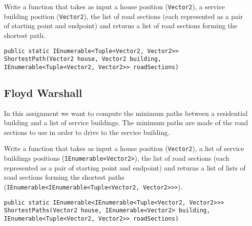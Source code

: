 \documentclass[10pt,a4paper]{article}
\begin{document}
Write a function that takes as input a house position (\texttt{Vector2}), a service building position (\texttt{Vector2}), the list of road sections (each represented as a pair of starting point and endpoint) and returns a list of road sections forming the shortest path.

\begin{lstlisting}
public static IEnumerable<Tuple<Vector2, Vector2>> ShortestPath(Vector2 house, Vector2 building, IEnumerable<Tuple<Vector2, Vector2>> roadSections)
\end{lstlisting}

\subsection*{Floyd Warshall}
In this assignment we want to compute the minimum paths between a residential building and a list of service buildings. The minimum paths are made of the road sections to use in order to drive to the service building.

Write a function that takes as input a house position (\texttt{Vector2}), a list of service buildings positions (\texttt{IEnumerable<Vector2>}), the list of road sections (each represented as a pair of starting point and endpoint) and returns a list of lists of road sections forming the shortest paths (\texttt{IEnumerable<IEnumerable<Tuple<Vector2, Vector2>>>}).

\begin{lstlisting}
public static IEnumerable<IEnumerable<Tuple<Vector2, Vector2>>> ShortestPaths(Vector2 house, IEnumerable<Vector2> building, IEnumerable<Tuple<Vector2, Vector2>> roadSections)
\end{lstlisting}
\end{document}
